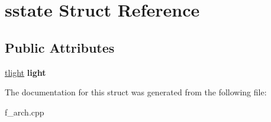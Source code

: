 \hypertarget{structsstate}{}\section{sstate Struct Reference}
\label{structsstate}
\subsection*{Public Attributes}
\begin{DoxyCompactItemize}
\item 
\mbox{\label{structsstate_a3deca680513516078dc09e0bf04dc120}} 
\mbox{\hyperlink{structslight}{tlight}} {\bfseries light}
\end{DoxyCompactItemize}


The documentation for this struct was generated from the following file\+:\begin{DoxyCompactItemize}
\item 
f\+\_\+arch.\+cpp\end{DoxyCompactItemize}
